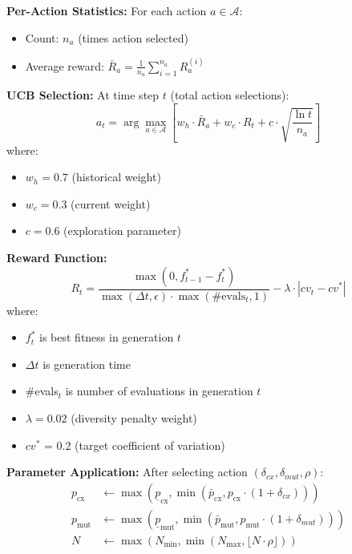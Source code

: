 \documentclass[12pt,a4paper]{article}
\begin{document}
\textbf{Per-Action Statistics:}
For each action $a \in \mathcal{A}$:
\begin{itemize}
\item Count: $n_a$ (times action selected)
\item Average reward: $\bar{R}_a = \frac{1}{n_a} \sum_{i=1}^{n_a} R_a^{(i)}$
\end{itemize}

\textbf{UCB Selection:}
At time step $t$ (total action selections):
\begin{equation}
a_t = \arg\max_{a \in \mathcal{A}} \left[ w_h \cdot \bar{R}_a + w_c \cdot R_t + c \cdot \sqrt{\frac{\ln t}{n_a}} \right] \label{eq:ucb_selection}
\end{equation}
where:
\begin{itemize}
\item $w_h = 0.7$ (historical weight)
\item $w_c = 0.3$ (current weight)
\item $c = 0.6$ (exploration parameter)
\end{itemize}

\textbf{Reward Function:}
\begin{equation}
R_t = \frac{\max(0, f_{t-1}^* - f_t^*)}{\max(\Delta t, \epsilon) \cdot \max(\#\text{evals}_t, 1)} - \lambda \cdot |cv_t - cv^*| \label{eq:bandit_reward}
\end{equation}
where:
\begin{itemize}
\item $f_t^*$ is best fitness in generation $t$
\item $\Delta t$ is generation time
\item $\#$evals$_t$ is number of evaluations in generation $t$
\item $\lambda = 0.02$ (diversity penalty weight)
\item $cv^*$ = 0.2 (target coefficient of variation)
\end{itemize}

\textbf{Parameter Application:}
After selecting action $(\delta_{cx}, \delta_{mut}, \rho)$:
\begin{align}
p_{\text{cx}} &\leftarrow \max(\underline{p}_{\text{cx}}, \min(\bar{p}_{\text{cx}}, p_{\text{cx}} \cdot (1 + \delta_{cx}))) \label{eq:bandit_cx_update} \\
p_{\text{mut}} &\leftarrow \max(\underline{p}_{\text{mut}}, \min(\bar{p}_{\text{mut}}, p_{\text{mut}} \cdot (1 + \delta_{mut}))) \label{eq:bandit_mut_update} \\
N &\leftarrow \max(N_{\min}, \min(N_{\max}, \lfloor N \cdot \rho \rfloor)) \label{eq:bandit_pop_update}
\end{align}
\end{document}
